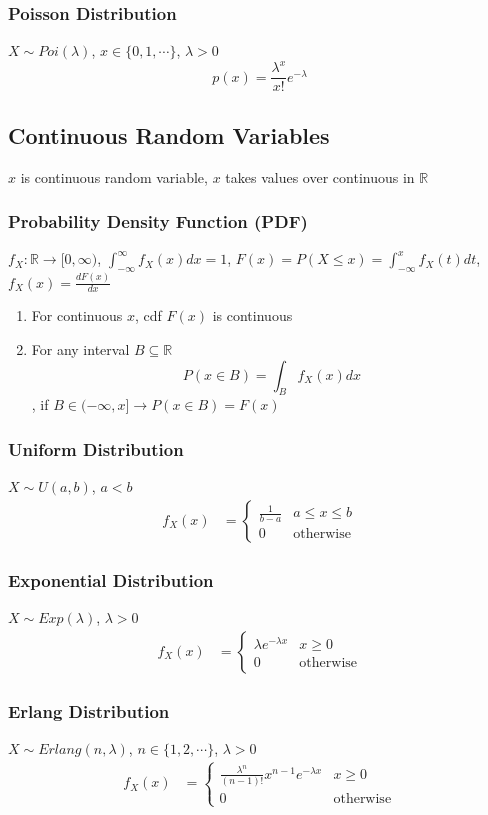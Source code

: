 \documentclass[11pt]{article}
\newcommand{\R}{{\mathbb{R}}}
\newcommand{\ds}{\displaystyle}
\begin{document}
\subsubsection*{Poisson Distribution}
$X\sim Poi(\lambda)$, $x\in\{0,1,\cdots\}$, $\lambda>0$
\[p(x) = \frac{\lambda^x}{x!}e^{-\lambda}\]
\subsection{Continuous Random Variables}
$x$ is continuous random variable, $x$ takes values over continuous in $\R$ 
\subsubsection*{Probability Density Function (PDF)}
$f_X:\R\to[0,\infty)$, $\ds\int_{-\infty}^{\infty}f_X(x)dx=1$, $\ds F(x)=P(X\leq x)=\int_{-\infty}^{x}f_X(t)dt$, $f_X(x)=\ds\frac{dF(x)}{dx}$
\begin{enumerate}
    \item For continuous $x$, cdf $F(x)$ is continuous 
    \item For any interval $B\subseteq\R$ \[P(x\in B)=\int_B f_X(x)dx\], if $B\in(-\infty,x]\rightarrow P(x\in B)=F(x)$
\end{enumerate}
\subsubsection*{Uniform Distribution}
$X\sim U(a,b)$, $a<b$
\begin{align*}
    f_X(x) &= \begin{cases}
        \ds\frac{1}{b-a} & a\leq x\leq b \\
        0 & \text{otherwise}
    \end{cases}
\end{align*}
\subsubsection*{Exponential Distribution}
$X\sim Exp(\lambda)$, $\lambda>0$
\begin{align*}
    f_X(x) &= \begin{cases}
        \ds\lambda e^{-\lambda x} & x\geq 0 \\
        0 & \text{otherwise}
    \end{cases}
\end{align*}
\subsubsection*{Erlang Distribution}
$X\sim Erlang(n,\lambda)$, $n\in\{1,2,\cdots\}$, $\lambda>0$
\begin{align*}
    f_X(x) &= \begin{cases}
        \ds\frac{\lambda^n}{(n-1)!}x^{n-1}e^{-\lambda x} & x\geq 0 \\
        0 & \text{otherwise}
    \end{cases}
\end{align*}
\end{document}
